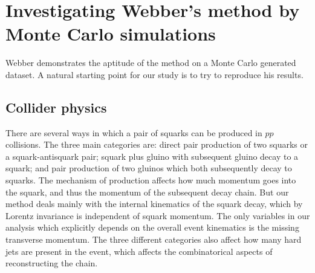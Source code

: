 \documentclass[twoside,english]{uiofysmaster}
\begin{document}
\begin{enumerate}
\end{enumerate}






























\chapter{Investigating Webber's method by Monte Carlo simulations}
\label{ch:MC}
Webber demonstrates the aptitude of the method on a Monte Carlo generated dataset. A natural starting point for our study is to try to reproduce his results. 

\section{Collider physics}
There are several ways in which a pair of squarks can be produced in $pp$ collisions. The three main categories are: direct pair production of two squarks or a squark-antisquark pair; squark plus gluino with subsequent gluino decay to a squark; and pair production of two gluinos which both subsequently decay to squarks. The mechanism of production affects how much momentum goes into the squark, and thus the momentum of the subsequent decay chain. But our method deals mainly with the internal kinematics of the squark decay, which by Lorentz invariance is independent of squark momentum. The only variables in our analysis which explicitly depends on the overall event kinematics is the missing transverse momentum. The three different categories also affect how many hard jets are present in the event, which affects the combinatorical aspects of reconstructing the chain.
\end{document}

